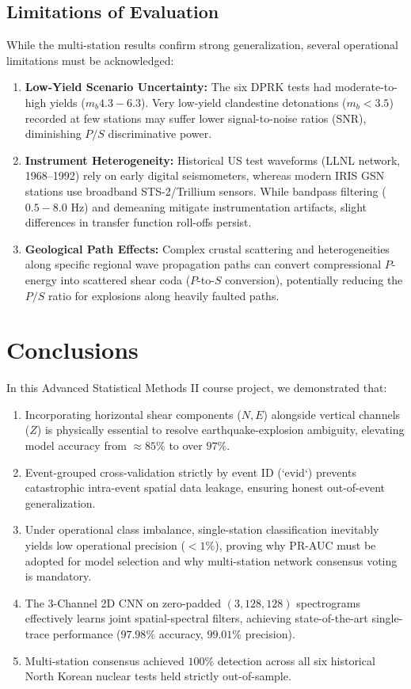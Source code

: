 \documentclass[11pt,a4paper]{article}
\begin{document}
\subsection{Limitations of Evaluation}
While the multi-station results confirm strong generalization, several operational limitations must be acknowledged:
\begin{enumerate}
    \item \textbf{Low-Yield Scenario Uncertainty:} The six DPRK tests had moderate-to-high yields ($m_b 4.3 - 6.3$). Very low-yield clandestine detonations ($m_b < 3.5$) recorded at few stations may suffer lower signal-to-noise ratios (SNR), diminishing $P/S$ discriminative power.
    \item \textbf{Instrument Heterogeneity:} Historical US test waveforms (LLNL network, 1968--1992) rely on early digital seismometers, whereas modern IRIS GSN stations use broadband STS-2/Trillium sensors. While bandpass filtering ($0.5 - 8.0\text{ Hz}$) and demeaning mitigate instrumentation artifacts, slight differences in transfer function roll-offs persist.
    \item \textbf{Geological Path Effects:} Complex crustal scattering and heterogeneities along specific regional wave propagation paths can convert compressional $P$-energy into scattered shear coda ($P$-to-$S$ conversion), potentially reducing the $P/S$ ratio for explosions along heavily faulted paths.
\end{enumerate}


\section{Conclusions}
In this Advanced Statistical Methods II course project, we demonstrated that:
\begin{enumerate}
    \item Incorporating horizontal shear components ($N, E$) alongside vertical channels ($Z$) is physically essential to resolve earthquake-explosion ambiguity, elevating model accuracy from $\approx 85\%$ to over $97\%$.
    \item Event-grouped cross-validation strictly by event ID (`evid`) prevents catastrophic intra-event spatial data leakage, ensuring honest out-of-event generalization.
    \item Under operational class imbalance, single-station classification inevitably yields low operational precision ($<1\%$), proving why PR-AUC must be adopted for model selection and why multi-station network consensus voting is mandatory.
    \item The 3-Channel 2D CNN on zero-padded $(3, 128, 128)$ spectrograms effectively learns joint spatial-spectral filters, achieving state-of-the-art single-trace performance ($97.98\%$ accuracy, $99.01\%$ precision).
    \item Multi-station consensus achieved $100\%$ detection across all six historical North Korean nuclear tests held strictly out-of-sample.
\end{enumerate}
\end{document}
